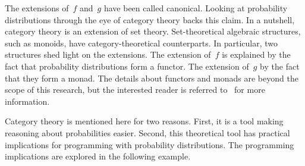 \begin{note}
The extensions of~\(f\) and~\(g\) have been called canonical.
Looking at probability distributions through the eye of category theory backs this claim.
In a nutshell, category theory is an extension of set theory.
Set-theoretical algebraic structures, such as monoids, have category-theoretical counterparts.
In particular, two structures shed light on the extensions.
The extension of~\(f\) is explained by the fact that probability distributions form a functor.
The extension of~\(g\) by the fact that they form a monad.
The details about functors and monads are beyond the scope of this research, but the interested reader is referred to~\cite{mac-lane:1998,spivak:2014} for more information.

Category theory is mentioned here for two reasons.
First, it is a tool making reasoning about probabilities easier.
Second, this theoretical tool has practical implications for programming with probability distributions.
The programming implications are explored in the following example.
\end{note}

